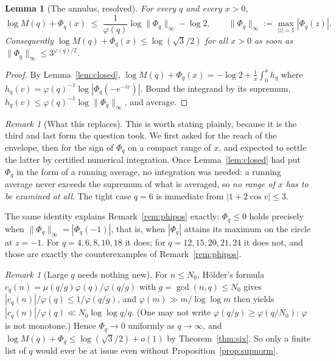 \documentclass[11pt,a4paper]{article}
\theoremstyle{plain}
\newtheorem{lemma}[theorem]{Lemma}
\theoremstyle{definition}
\theoremstyle{remark}
\newtheorem{remark}[theorem]{Remark}
\begin{document}
\begin{lemma}[The annulus, resolved]\label{lem:supnorm}
For every $q$ and every $x>0$,
\[
  \log M(q)+\Phi_q(x)\;\le\;\frac{1}{\varphi(q)}\log\|\Phi_q\|_{\infty}-\log2,
  \qquad \|\Phi_q\|_{\infty}:=\max_{|z|=1}|\Phi_q(z)| .
\]
Consequently $\log M(q)+\Phi_q(x)\le\log(\sqrt3/2)$ for all $x>0$ as soon as
$\|\Phi_q\|_{\infty}\le3^{\varphi(q)/2}$.
\end{lemma}

\begin{proof}
By Lemma~\ref{lem:closed}, $\log M(q)+\Phi_q(x)=-\log2+\frac1x\int_0^{x}h_q$
where $h_q(v)=\varphi(q)^{-1}\log|\Phi_q(-e^{-iv})|$. Bound the integrand by its
supremum, $h_q(v)\le\varphi(q)^{-1}\log\|\Phi_q\|_{\infty}$, and average.
\end{proof}

\begin{remark}[What this replaces]\label{rem:trivial}
This is worth stating plainly, because it is the third and last form the
question took. We first asked for the reach of the envelope, then for the sign
of $\Phi_q$ on a compact range of $x$, and expected to settle the latter by
certified numerical integration. Once Lemma~\ref{lem:closed} had put $\Phi_q$
in the form of a running average, no integration was needed: a running average
never exceeds the supremum of what is averaged, so \emph{no range of $x$ has to
be examined at all}. The tight case $q=6$ is immediate from $|1+2\cos v|\le3$.

The same identity explains Remark~\ref{rem:phipos} exactly: $\Phi_q\le0$ holds
precisely when $\|\Phi_q\|_{\infty}=|\Phi_q(-1)|$, that is, when $|\Phi_q|$
attains its maximum on the circle at $z=-1$. For $q=4,6,8,10,18$ it does; for
$q=12,15,20,21,24$ it does not, and those are exactly the counterexamples of
Remark~\ref{rem:phipos}.
\end{remark}

\begin{remark}[Large $q$ needs nothing new]\label{rem:flat}
For $n\le N_0$, H\"older's formula
$c_q(n)=\mu(q/g)\varphi(q)/\varphi(q/g)$ with $g=\gcd(n,q)\le N_0$ gives
$|c_q(n)|/\varphi(q)\le1/\varphi(q/g)$, and $\varphi(m)\gg m/\log\log m$ then
yields $|c_q(n)|/\varphi(q)\ll N_0\log\log q/q$. (One may not write
$\varphi(q/g)\ge\varphi(q/N_0)$: $\varphi$ is not monotone.) Hence
$\Phi_q\to0$ uniformly as $q\to\infty$, and
$\log M(q)+\Phi_q\le\log(\sqrt3/2)+o(1)$ by Theorem~\ref{thm:six}. So only a
finite list of $q$ would ever be at issue even without
Proposition~\ref{prop:supnorm}.
\end{remark}
\end{document}
